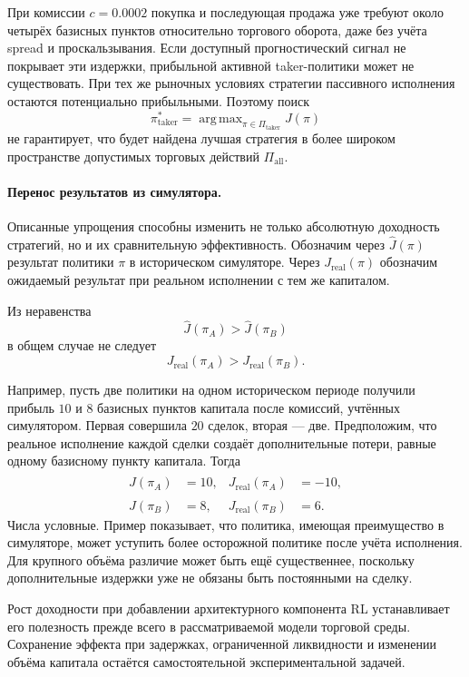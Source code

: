 \documentclass[9pt,a4paper,twocolumn]{extarticle}
\DeclareMathOperator*{\argmax}{arg\,max}
\begin{document}
При комиссии $c=0.0002$ покупка и последующая продажа уже требуют около четырёх базисных пунктов
относительно торгового оборота, даже без учёта spread и проскальзывания. Если доступный
прогностический сигнал не покрывает эти издержки, прибыльной активной taker-политики может не
существовать. При тех же рыночных условиях стратегии пассивного исполнения остаются потенциально
прибыльными. Поэтому поиск
\[
    \pi^*_{\mathrm{taker}}
    =
    \argmax_{\pi\in\Pi_{\mathrm{taker}}}J(\pi)
\]
не гарантирует, что будет найдена лучшая стратегия в более широком пространстве допустимых
торговых действий $\Pi_{\mathrm{all}}$.

\paragraph{Перенос результатов из симулятора.}

Описанные упрощения способны изменить не только абсолютную доходность стратегий, но и их
сравнительную эффективность. Обозначим через $\widehat J(\pi)$ результат политики $\pi$ в
историческом симуляторе. Через $J_{\mathrm{real}}(\pi)$ обозначим ожидаемый результат при
реальном исполнении с тем же капиталом.

Из неравенства
\[
    \widehat J(\pi_A)>
    \widehat J(\pi_B)
\]
в общем случае не следует
\[
    J_{\mathrm{real}}(\pi_A)>
    J_{\mathrm{real}}(\pi_B).
\]

Например, пусть две политики на одном историческом периоде получили прибыль $10$ и $8$ базисных
пунктов капитала после комиссий, учтённых симулятором. Первая совершила $20$ сделок,
вторая --- две. Предположим, что реальное исполнение каждой сделки создаёт дополнительные
потери, равные одному базисному пункту капитала. Тогда
\begin{equation}
    \begin{aligned}
      \widehat J(\pi_A)&=10,
      &J_{\mathrm{real}}(\pi_A)&=-10,\\
      \widehat J(\pi_B)&=8,
      &J_{\mathrm{real}}(\pi_B)&=6.
    \end{aligned}
    \label{eq:policy_ranking_reversal}
\end{equation}
Числа условные. Пример показывает, что политика, имеющая преимущество в симуляторе, может
уступить более осторожной политике после учёта исполнения. Для крупного объёма различие может
быть ещё существеннее, поскольку дополнительные издержки уже не обязаны быть постоянными на
сделку.

Рост доходности при добавлении архитектурного компонента RL устанавливает его полезность прежде
всего в рассматриваемой модели торговой среды. Сохранение эффекта при задержках, ограниченной
ликвидности и изменении объёма капитала остаётся самостоятельной экспериментальной задачей.
\end{document}
